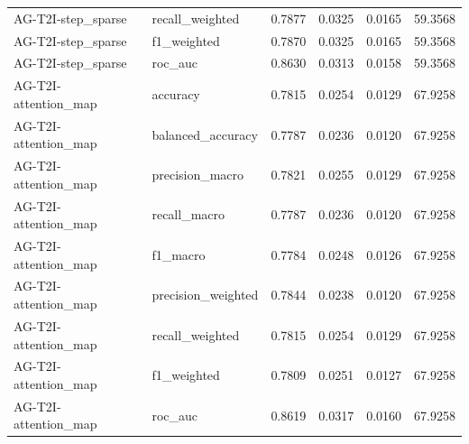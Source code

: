 \begin{tabular}{llrrrr}
AG-T2I-step_sparse & recall_weighted & 0.7877 & 0.0325 & 0.0165 & 59.3568 \\
AG-T2I-step_sparse & f1_weighted & 0.7870 & 0.0325 & 0.0165 & 59.3568 \\
AG-T2I-step_sparse & roc_auc & 0.8630 & 0.0313 & 0.0158 & 59.3568 \\
AG-T2I-attention_map & accuracy & 0.7815 & 0.0254 & 0.0129 & 67.9258 \\
AG-T2I-attention_map & balanced_accuracy & 0.7787 & 0.0236 & 0.0120 & 67.9258 \\
AG-T2I-attention_map & precision_macro & 0.7821 & 0.0255 & 0.0129 & 67.9258 \\
AG-T2I-attention_map & recall_macro & 0.7787 & 0.0236 & 0.0120 & 67.9258 \\
AG-T2I-attention_map & f1_macro & 0.7784 & 0.0248 & 0.0126 & 67.9258 \\
AG-T2I-attention_map & precision_weighted & 0.7844 & 0.0238 & 0.0120 & 67.9258 \\
AG-T2I-attention_map & recall_weighted & 0.7815 & 0.0254 & 0.0129 & 67.9258 \\
AG-T2I-attention_map & f1_weighted & 0.7809 & 0.0251 & 0.0127 & 67.9258 \\
AG-T2I-attention_map & roc_auc & 0.8619 & 0.0317 & 0.0160 & 67.9258 \\
\bottomrule
\end{tabular}
